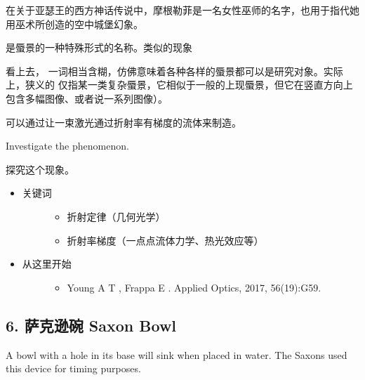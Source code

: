 \documentclass[a4paper,10pt,english]{sphinxmanual}
\begin{document}
\begin{footnote}[4]\sphinxAtStartFootnote
在关于亚瑟王的西方神话传说中，摩根勒菲是一名女性巫师的名字，也用于指代她用巫术所创造的空中城堡幻象。
%
\end{footnote} 是蜃景的一种特殊形式的名称。类似的现象 %
\begin{footnote}[5]\sphinxAtStartFootnote
看上去，  一词相当含糊，仿佛意味着各种各样的蜃景都可以是研究对象。实际上，狭义的  仅指某一类复杂蜃景，它相似于一般的上现蜃景，但它在竖直方向上包含多幅图像、或者说一系列图像）。
%
\end{footnote} 可以通过让一束激光通过折射率有梯度的流体来制造。

Investigate the phenomenon.

探究这个现象。

\noindent{}
\begin{itemize}
\item {} \begin{description}
\item[{关键词}] \leavevmode\begin{itemize}
\item {} 
折射定律（几何光学）

\item {} 
折射率梯度（一点点流体力学、热光效应等）

\end{itemize}

\end{description}

\item {} \begin{description}
\item[{从这里开始}] \leavevmode\begin{itemize}
\item {} 
Young A T , Frappa E .  Applied Optics, 2017, 56(19):G59.

\end{itemize}

\end{description}

\end{itemize}


\subsection{6. 萨克逊碗 Saxon Bowl}
\label{\detokenize{7. Appendix:saxon-bowl}}
A bowl with a hole in its base will sink when placed in water. The Saxons used this device for timing purposes.
\end{document}
